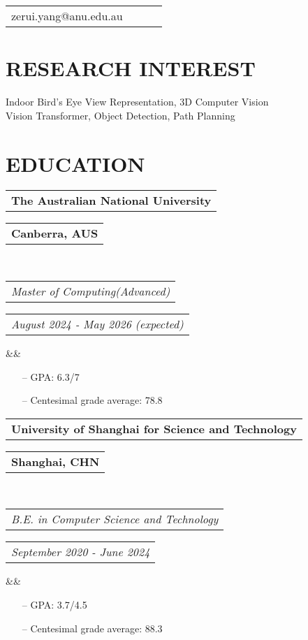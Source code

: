 \documentclass[11pt,a4paper,roman]{moderncv}        %
\makeatletter
\newcommand*{\customcventry}[7][.25em]{
	\begin{tabular}{@{}l} 
		{\bfseries #4}
	\end{tabular}
	\hfill%
	\begin{tabular}{l@{}}
		{\bfseries #5}
	\end{tabular} \\
	\begin{tabular}{@{}l} 
		{\itshape #3}
	\end{tabular}
	\hfill%
	\begin{tabular}{l@{}}
		{\itshape #2}
	\end{tabular}
	\ifx&#7&%
	\else{\\%
		\begin{minipage}{\maincolumnwidth}%
			\small#7%
	\end{minipage}}\fi%
	\par\addvspace{#1}}
\makeatother
\begin{document}
	\makecvtitle
	\vspace*{-16mm}
	
	\begin{center}
		\renewcommand{\arraystretch}{1.3}
		\begin{tabular}{ c c c c }
			\faEnvelopeO\enspace zerui.yang@anu.edu.au \enspace  \enspace
		\end{tabular}
	\end{center}
	
	\vspace*{-2.5mm}
	

	\cfoot{\vspace{-2mm}{\color{gray} \rule[-10pt]{14.3cm}{0.05em}} \vspace{2mm}\\ \emph{\textcolor{gray}{Last Updated by: 2025/10/01}}}
	
	\section{RESEARCH INTEREST}
	Indoor Bird's Eye View Representation, 3D Computer Vision \\ 
    Vision Transformer, Object Detection, Path Planning
	
	\section{EDUCATION}
	{\customcventry{August 2024 - May 2026 (expected)}{Master of Computing(Advanced) }{The Australian National University}{Canberra, AUS}{}{}}
	
	\begin{itemize}
		\item[--] GPA: 6.3/7  
		\item[--] Centesimal grade average: 78.8 
	\end{itemize}
	\vspace{2mm}
	
	{\customcventry{September 2020 - June 2024}{B.E. in Computer Science and Technology }{University of Shanghai for Science and Technology}{Shanghai, CHN}{}{}}
	
	\begin{itemize}
		\item[--] GPA: 3.7/4.5 
		\item[--] Centesimal grade average: 88.3 
	\end{itemize}
\end{document}
